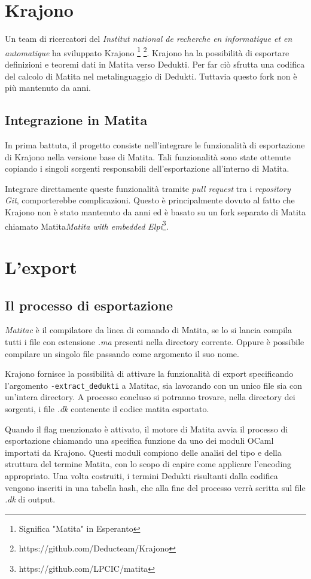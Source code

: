 \documentclass[12pt,a4paper]{mimosis}
\begin{document}
\section{Krajono}
Un team di ricercatori del \textit{Institut national de recherche en informatique 
et en automatique} ha sviluppato Krajono \footnote{Significa "Matita" in Esperanto}
\footnote{https://github.com/Deducteam/Krajono}. Krajono ha la possibilità
di esportare definizioni e teoremi dati in Matita verso Dedukti. Per far ciò
sfrutta una codifica del calcolo di Matita nel metalinguaggio di Dedukti. 
Tuttavia questo fork non è più mantenuto da anni.

\subsection{Integrazione in Matita}
In prima battuta, il progetto consiste nell'integrare le funzionalità di 
esportazione di Krajono nella versione base di Matita. Tali funzionalità sono
state ottenute copiando i singoli sorgenti responsabili dell'esportazione 
all'interno di Matita.

Integrare direttamente queste funzionalità tramite \textit{pull request} tra
i \textit{repository Git}, comporterebbe complicazioni. Questo
è principalmente dovuto al fatto che Krajono non è stato mantenuto da anni ed
è basato su un fork separato di Matita chiamato Matita\textit{Matita with embedded
Elpi}\footnote{https://github.com/LPCIC/matita}. 


\section{L'export}
\subsection{Il processo di esportazione}
\textit{Matitac} è il compilatore da linea di comando di Matita, se lo si lancia
compila tutti i file con estensione \textit{.ma} presenti nella directory corrente. 
Oppure è possibile compilare un singolo file passando come argomento il suo
nome.

Krajono fornisce la possibilità di attivare la funzionalità di export specificando l'argomento \texttt{-extract\_dedukti} a Matitac,
sia lavorando con un unico file sia con un'intera directory. A processo concluso 
si potranno trovare, nella directory dei sorgenti, i file \textit{.dk} contenente
il codice matita esportato.

Quando il flag menzionato è attivato, il motore di Matita avvia il processo di
esportazione chiamando una specifica funzione da uno dei moduli OCaml importati
da Krajono. Questi moduli compiono delle analisi del tipo e della struttura del
termine Matita, con lo scopo di capire come applicare l'encoding appropriato.
Una volta costruiti, i termini Dedukti risultanti dalla codifica vengono inseriti
in una tabella hash, che alla fine del processo verrà scritta sul file \textit{.dk}
di output.
\end{document}
